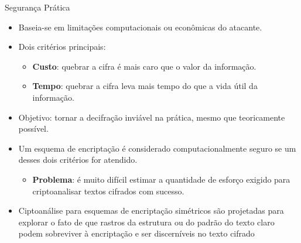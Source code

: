 \begin{frame}{Segurança Prática}

    \begin{itemize}
        \item Baseia-se em limitações computacionais ou econômicas do atacante.
        \item Dois critérios principais:
              \begin{itemize}
                  \item \textbf{Custo}: quebrar a cifra é mais caro que o valor da informação.
                  \item \textbf{Tempo}: quebrar a cifra leva mais tempo do que a vida útil da informação.
              \end{itemize}
        \item Objetivo: tornar a decifração inviável na prática, mesmo que teoricamente possível.

        \item Um esquema de encriptação é considerado computacionalmente seguro se um desses dois critérios for atendido.
              \begin{itemize}
                  \item \textbf{Problema}: é muito difícil estimar a quantidade de esforço exigido para criptoanalisar textos
                        cifrados com sucesso.
              \end{itemize}
        \item Ciptoanálise para esquemas de encriptação simétricos são projetadas para explorar o
              fato de que rastros da estrutura ou do padrão do texto claro podem sobreviver à encriptação e ser discerníveis
              no texto cifrado
    \end{itemize}
\end{frame}

